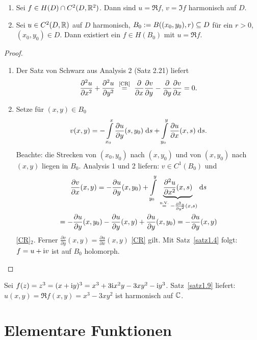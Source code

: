 \documentclass[a4paper,twoside,DIV15,BCOR12mm]{scrbook}
\begin{document}
\begin{satz} \label{satz1.9}
\begin{enumerate}
\item Sei $f\in H(D) \cap C^2(D, \mathbb{R}^2)$. Dann sind $u=\Re f$, $v = \Im f$ harmonisch auf $D$.
\item Sei $u \in C^2(D, \mathbb{R})$ auf $D$ harmonisch, $B_0 := B((x_0,y_0),r) \subseteq D$ für ein $r>0$, $(x_0,y_0)\in D$. Dann existiert ein $f\in H(B_0)$ mit $u = \Re f$.
\end{enumerate}
\end{satz}
\begin{proof}
\begin{enumerate}
\item Der Satz von Schwarz aus Analysis 2 (Satz 2.21) liefert
\[\frac{\partial^2u}{\partial x^2} + \frac{\partial^2u}{\partial y^2} \nach{=}{\eqref{CR}}
\frac{\partial}{\partial x} \frac{\partial v}{\partial y} - \frac{\partial}{\partial y} \frac{\partial v}{\partial x} = 0.\]
\item Setze für $(x, y) \in B_0$
\[v(x, y) = - \int\limits_{x_0}^{x}{\frac{\partial u}{\partial y}(s, y_0)}\;\mathrm{d}s +
\int\limits_{y_0}^{y}{\frac{\partial u}{\partial x}(x, s)}\;\mathrm{d}s.\]
Beachte: die Strecken von $(x_0,y_0)$ nach $(x,y_0)$ und von $(x,y_0)$ nach $(x,y)$ liegen in $B_0$. Analysis 1 und 2 liefern: $v\in C^1(B_0)$ und
\begin{multline*}
\frac{\partial v}{\partial x}(x, y) = - \frac{\partial u}{\partial y}(x, y_0) + \Integral{y_0}{y}{\underbrace{\frac{\partial^2 u}{\partial x^2}(x, s)}_{\nach{=}{n.V.} - \frac{\partial^2 u}{\partial y^2}(x,s)}}{s}\\
= - \frac{\partial u}{\partial y}(x, y_0) - \frac{\partial u}{\partial y}(x, y) + \frac{\partial u}{\partial y}(x, y_0)
= - \frac{\partial u}{\partial y}(x, y)
\end{multline*}
\folgt \eqref{CR}$_2$.
Ferner $\frac{\partial v}{\partial y}(x, y) = \frac{\partial u}{\partial x}(x, y)$ \folgt \eqref{CR} gilt. Mit
Satz~\ref{satz1.4} folgt: $f=u+\mathrm{i} v$ ist auf $B_0$ holomorph. \qedhere
\end{enumerate}
\end{proof}

\begin{bsp*}
Sei $f(z) = z^3 = (x+\mathrm{i} y)^3 = x^3 + 3\mathrm{i} x^2 y - 3xy^2 - \mathrm{i} y^3$. Satz~\ref{satz1.9} liefert: $u(x,y) = \Re f(x, y) = x^3 - 3xy^2$ ist harmonisch auf $\mathbb{C}$.
\end{bsp*}


\section{Elementare Funktionen}
\end{document}
